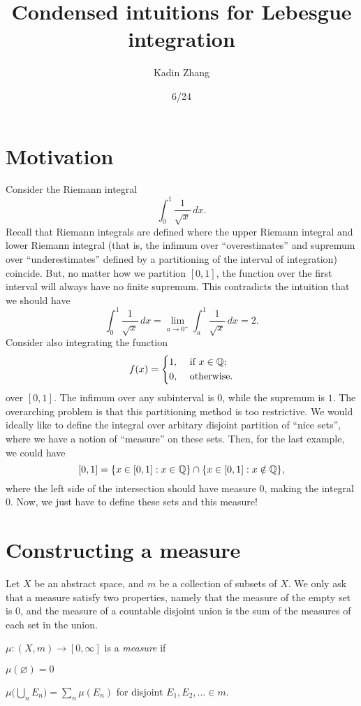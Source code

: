 \documentclass{article}
\title{Condensed intuitions for Lebesgue integration}
\author{Kadin Zhang}
\date{6/24}
\begin{document}
\maketitle
{
\small
\setlength{\parindent}{0em}
\setlength{\parskip}{1em}
}

\section{Motivation}
Consider the Riemann integral
\[
    \int_{0}^{1} \frac{1}{\sqrt{x} } \,dx. 
\]
Recall that Riemann integrals are defined where the upper Riemann integral and lower Riemann integral (that is, the infimum over ``overestimates'' and supremum over ``underestimates'' defined by a partitioning of the interval of integration) coincide. But, no matter how we partition $[0, 1]$, the function over the first interval will always have no finite supremum. This contradicts the intuition that we should have 
\[
    \int_{0}^{1} \frac{1}{\sqrt{x} } \,dx = \lim_{a \to 0^+ } \int_{a}^{1} \frac{1}{\sqrt{x} } \,dx  = 2.  
\]
Consider also integrating the function 
\[
    f(x) = \begin{dcases}
        1, &\text{ if } x \in \mathbb{Q}  ;\\
        0, &\text{ otherwise} .
    \end{dcases}
\]
over $[0, 1]$. The infimum over any subinterval is $0$, while the supremum is $1$. The overarching problem is that this partitioning method is too restrictive. We would ideally like to define the integral over arbitary disjoint partition of ``nice sets'', where we have a notion of ``measure'' on these sets. Then, for the last example, we could have 
\[
    [0, 1] = \braces*{x \in [0, 1] : x \in \Q } \cap  \braces*{x \in [0, 1] : x \notin  \Q },
\]
where the left side of the intersection should have measure $0$, making the integral $0$. Now, we just have to define these sets and this measure! 

\section{Constructing a measure}
Let $X$ be an abstract space, and $m$ be a collection of subsets of $X$. We only ask that a measure satisfy two properties, namely that the measure of the empty set is $0$, and the measure of a countable disjoint union is the sum of the measures of each set in the union. 
\begin{defi}[Measure]
    $\mu : (X, m) \to  [0, \infty ]$ is a \emph{measure} if 
    \begin{enum}
        \item $\mu (\varnothing ) = 0$
        \item $\mu \biggl( \bigcup_n E_n  \biggr) = \sum_{n} \mu (E_n)  $ for disjoint  $E_1 , E_2 , \dots \in m$. 
    \end{enum}
\end{defi}
\end{document}
